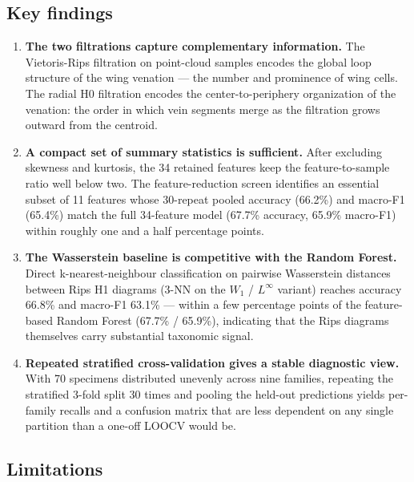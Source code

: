 \documentclass[
  a4paper,
  DIV=11,
  numbers=noendperiod]{scrartcl}
\providecommand{\tightlist}{%
  \setlength{\itemsep}{0pt}\setlength{\parskip}{0pt}}
\begin{document}
\subsection{Key findings}\label{key-findings}

\begin{enumerate}
\def\labelenumi{\arabic{enumi}.}
\tightlist
\item
  \textbf{The two filtrations capture complementary information.} The
  Vietoris-Rips filtration on point-cloud samples encodes the global
  loop structure of the wing venation --- the number and prominence of
  wing cells. The radial H0 filtration encodes the center-to-periphery
  organization of the venation: the order in which vein segments merge
  as the filtration grows outward from the centroid.
\item
  \textbf{A compact set of summary statistics is sufficient.} After
  excluding skewness and kurtosis, the 34 retained features keep the
  feature-to-sample ratio well below two. The feature-reduction screen
  identifies an essential subset of 11 features whose 30-repeat pooled
  accuracy (66.2\%) and macro-F1 (65.4\%) match the full 34-feature
  model (67.7\% accuracy, 65.9\% macro-F1) within roughly one and a half
  percentage points.
\item
  \textbf{The Wasserstein baseline is competitive with the Random
  Forest.} Direct k-nearest-neighbour classification on pairwise
  Wasserstein distances between Rips H1 diagrams (3-NN on the \(W_1\) /
  \(L^\infty\) variant) reaches accuracy 66.8\% and macro-F1 63.1\% ---
  within a few percentage points of the feature-based Random Forest
  (67.7\% / 65.9\%), indicating that the Rips diagrams themselves carry
  substantial taxonomic signal.
\item
  \textbf{Repeated stratified cross-validation gives a stable diagnostic
  view.} With 70 specimens distributed unevenly across nine families,
  repeating the stratified 3-fold split 30 times and pooling the
  held-out predictions yields per-family recalls and a confusion matrix
  that are less dependent on any single partition than a one-off LOOCV
  would be.
\end{enumerate}

\subsection{Limitations}\label{limitations}
\end{document}
